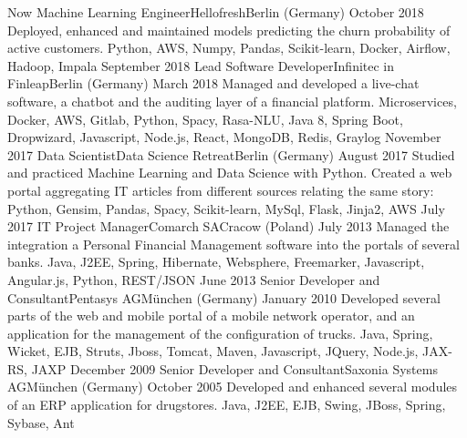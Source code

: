 %
%
%
\begin{experiences}
 \experience
    {Now}       {Machine Learning Engineer}{Hellofresh}{Berlin (Germany)}
    {October 2018}  {Deployed, enhanced and maintained models predicting the churn probability of active customers.}
                    {Python, AWS, Numpy, Pandas, Scikit-learn, Docker, Airflow, Hadoop, Impala}
  \emptySeparator
  \experience
    {September 2018}       {Lead Software Developer}{Infinitec in Finleap}{Berlin (Germany)}
    {March 2018}  {Managed and developed a live-chat software, a chatbot and the auditing layer of a financial platform.}
                    {Microservices, Docker, AWS, Gitlab, Python, Spacy, Rasa-NLU, Java 8, Spring Boot, Dropwizard, Javascript, Node.js, React, MongoDB, Redis, Graylog}
  \emptySeparator
  \experience
    {November 2017}   {Data Scientist}{Data Science Retreat}{Berlin (Germany)}
    {August 2017}  {Studied and practiced Machine Learning and Data Science with Python. Created a web portal aggregating IT articles from different sources relating the same story: 
			}
                    {Python, Gensim, Pandas, Spacy, Scikit-learn, MySql, Flask, Jinja2, AWS}
  \emptySeparator
  \experience
    {July 2017} {IT Project Manager}{Comarch SA}{Cracow (Poland)}
    {July 2013} {Managed the integration a Personal Financial Management software into the portals of several banks.}
                    {Java, J2EE, Spring, Hibernate, Websphere, Freemarker, Javascript, Angular.js, Python, REST/JSON}
  \emptySeparator
  \experience
    {June 2013}    {Senior Developer and Consultant}{Pentasys AG}{München (Germany)}
    {January 2010} {Developed several parts of the web and mobile portal of a mobile network operator, and an application for the management of the configuration of trucks.}
                    {Java, Spring, Wicket, EJB, Struts, Jboss, Tomcat, Maven, Javascript, JQuery, Node.js, JAX-RS, JAXP}
  \emptySeparator
  \experience
  {December 2009}   {Senior Developer and Consultant}{Saxonia Systems AG}{München (Germany)}
  {October 2005}    {Developed and enhanced several modules of an ERP application for drugstores.}   
                    {Java, J2EE, EJB, Swing, JBoss, Spring, Sybase, Ant}

\end{experiences}
